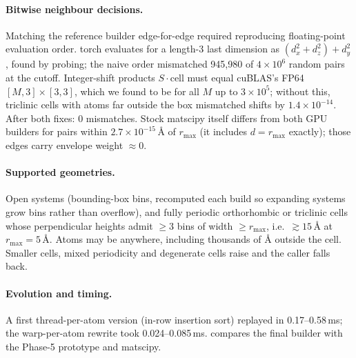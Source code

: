 \paragraph{Bitwise neighbour decisions.} Matching the reference builder edge-for-edge required reproducing floating-point evaluation order. torch evaluates  for a length-3 last dimension as $(d_x^2+d_z^2)+d_y^2$, found by probing; the naive order mismatched 945{,}980 of $4\times10^6$ random pairs at the cutoff. Integer-shift products $S\cdot\text{cell}$ must equal cuBLAS's FP64 $[M,3]\times[3,3]$, which we found to be  for all $M$ up to $3\times10^5$; without this, triclinic cells with atoms far outside the box mismatched shifts by $1.4\times10^{-14}$. After both fixes: 0 mismatches. Stock matscipy itself differs from both GPU builders for pairs within $2.7\times10^{-15}$\,\AA{} of $r_{\max}$ (it includes $d=r_{\max}$ exactly); those edges carry envelope weight $\approx0$.

\paragraph{Supported geometries.} Open systems (bounding-box bins, recomputed each build so expanding systems grow bins rather than overflow), and fully periodic orthorhombic or triclinic cells whose perpendicular heights admit $\ge3$ bins of width $\ge r_{\max}$, i.e.\ $\gtrsim15$\,\AA{} at $r_{\max}=5$\,\AA. Atoms may be anywhere, including thousands of \AA{} outside the cell. Smaller cells, mixed periodicity and degenerate cells raise  and the caller falls back.

\paragraph{Evolution and timing.} A first thread-per-atom version (in-row insertion sort) replayed in 0.17--0.58\,ms; the warp-per-atom rewrite took 0.024--0.085\,ms.  compares the final builder with the Phase-5 prototype and matscipy.

